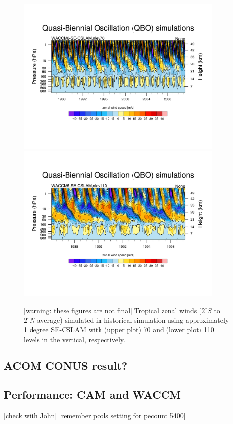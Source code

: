 \documentclass[draft]{agujournal2019}
\begin{document}
\begin{figure}
\noindent\includegraphics[width=0.9\textwidth]{figs/qbo/qbo_ne30pg3_nlev70.pdf}\\

\noindent\includegraphics[width=0.9\textwidth]{figs/qbo/qbo_ne30pg3_nlev110.pdf}
\caption{[warning: these figures are not final] Tropical zonal winds ($2^\circ S$ to $2^\circ N$ average) simulated in historical simulation using approximately 1 degree SE-CSLAM with (upper plot) 70 and (lower plot) 110  levels in the vertical, respectively.}
\end{figure}
\subsection{ACOM CONUS result?}
\subsection{Performance: CAM and WACCM}
[check with John] [remember pcols setting for pecount 5400]
\end{document}
